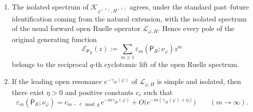 \begin{theorem}
\begin{enumerate}[label=(\roman*)]
    \[
      \widehat{\mathcal K}F_r
      := \mathcal K_{\varphi^{(\ell)},H^{(\ell)}}(F_{r+1}),
      \qquad r\in\ZZ/q\ZZ,
    \]
    on the \(q\)-fold product Banach space, with indices read modulo
    \(q\).  Then the block-error generating function
    \[
      \mathcal E_{\mathsf P_R}^{(\ell)}(z)
      := \sum_{n\geq 1}
         \varepsilon_n^{(\ell)}
           (\mathsf P_R^{(\ell)};\nu_{\varphi^{(\ell)}})z^n
    \]
    satisfies
    \[
      \mathcal E_{\mathsf P_R}^{(\ell)}(z)
      = z\,\widehat\Lambda^-
          (I-z\widehat{\mathcal K})^{-1}\widehat g^-,
    \]
    where \(\widehat g^-:=(g_0^-,\ldots,g_{q-1}^-)\) and
    \(\widehat\Lambda^-(F):=\Lambda^-(F_0)\).  Consequently every pole
    of \(\mathcal E_{\mathsf P_R}^{(\ell)}\) belongs to the reciprocal
    \(q\)-th cyclotomic lift of
    \(\spec(\mathcal K_{\varphi^{(\ell)},H^{(\ell)}})\).
  \item The isolated spectrum of
    \(\mathcal K_{\varphi^{(\ell)},H^{(\ell)}}\) agrees, under the
    standard past--future identification coming from the natural
    extension, with the isolated spectrum of the usual forward open
    Ruelle operator \(\mathcal L_{\varphi,H}\).  Hence every pole of the
    original generating function
    \[
      \mathcal E_{\mathsf P_R}(z)
      := \sum_{m\geq 1}
         \varepsilon_m(\mathsf P_R;\nu_\varphi)z^m
    \]
    belongs to the reciprocal \(q\)-th cyclotomic lift of the open
    Ruelle spectrum.
  \item If the leading open resonance
    \(e^{-\gamma_H(\varphi)}\) of \(\mathcal L_{\varphi,H}\) is simple
    and isolated, then there exist \(\eta>0\) and positive constants
    \(c_r\) such that
    \[
      \varepsilon_m(\mathsf P_R;\nu_\varphi)
      = c_{m-\ell\bmod q}\,e^{-m\gamma_H(\varphi)}
        + O\bigl(e^{-m(\gamma_H(\varphi)+\eta)}\bigr)
      \qquad (m\to\infty).
    \]
\end{enumerate}
\end{theorem}

